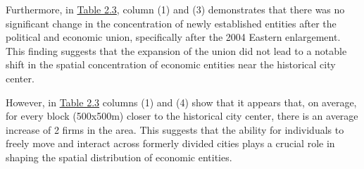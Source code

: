 \documentclass[12pt]{article}    %
\begin{document}
\par Furthermore, in \hyperlink{Table 2.3}{Table 2.3}, column (1) and (3) demonstrates that there was no significant change in the concentration of newly established entities after the political and economic union, specifically after the 2004 Eastern enlargement. This finding suggests that the expansion of the union did not lead to a notable shift in the spatial concentration of economic entities near the historical city center. 

\par However, in \hyperlink{Table 2.3}{Table 2.3} columns (1) and (4) show that it appears that, on average, for every block (500x500m) closer to the historical city center, there is an average increase of 2 firms in the area. This suggests that the ability for individuals to freely move and interact across formerly divided cities plays a crucial role in shaping the spatial distribution of economic entities. 
\end{document}
